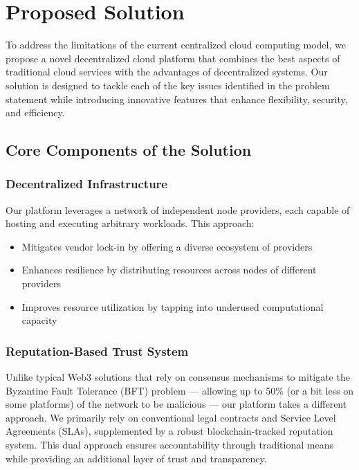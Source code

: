 \section{Proposed Solution}
\label{sec:proposed_solution}

To address the limitations of the current centralized cloud computing model, we propose a novel decentralized cloud platform that combines the best aspects of traditional cloud services with the advantages of decentralized systems. Our solution is designed to tackle each of the key issues identified in the problem statement while introducing innovative features that enhance flexibility, security, and efficiency.

\subsection{Core Components of the Solution}

\subsubsection{Decentralized Infrastructure}
Our platform leverages a network of independent node providers, each capable of hosting and executing arbitrary workloads. This approach:
\begin{itemize}
    \item Mitigates vendor lock-in by offering a diverse ecosystem of providers
    \item Enhances resilience by distributing resources across nodes of different providers
    \item Improves resource utilization by tapping into underused computational capacity
\end{itemize}

\subsubsection{Reputation-Based Trust System}
\label{subsec:reputation_system}

Unlike typical Web3 solutions that rely on consensus mechanisms to mitigate the Byzantine Fault Tolerance (BFT) problem --- allowing up to 50\% (or a bit less on some platforms) of the network to be malicious --- our platform takes a different approach. We primarily rely on conventional legal contracts and Service Level Agreements (SLAs), supplemented by a robust blockchain-tracked reputation system. This dual approach ensures accountability through traditional means while providing an additional layer of trust and transparency.


